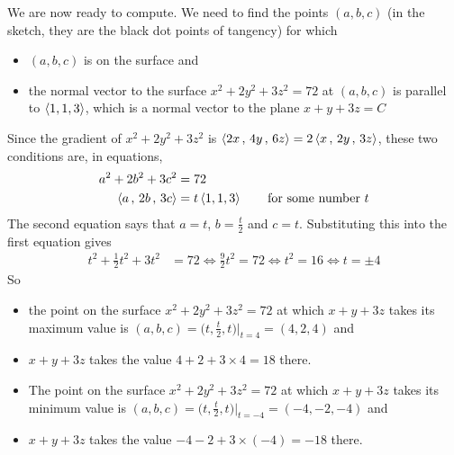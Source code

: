 \begin{eg}
We are now ready to compute. We need to find the points $(a,b,c)$
(in the sketch, they are the black dot points of tangency) for which
\begin{itemize}
\item $(a,b,c)$ is on the surface and
\item the normal vector to the surface $x^2+ 2y^2 +3z^2 = 72$
         at $(a,b,c)$ is parallel to $\left< 1,1,3\right>$, which is 
         a normal vector to the plane $x+y+3z=C$
\end{itemize}
Since the gradient of $x^2+ 2y^2 +3z^2$ is 
$\left< 2x\,,\,4y\,,\,6z\right>=2\left< x\,,\,2y\,,\,3z\right>$,
these two conditions are, in equations,
\begin{align*}
a^2+ 2b^2 +3c^2 &= 72 \\
\left< a\,,\,2b\,,\,3c\right> &=t \left< 1,1,3\right>\qquad
\text{for some number $t$}
\end{align*}
The second equation says that $a=t$, $b=\frac{t}{2}$ and $c=t$.
Substituting this into the first equation gives
\begin{align*}
t^2+ \frac{1}{2}t^2 +3t^2 &= 72
\iff \frac{9}{2}t^2=72
\iff t^2 = 16
\iff t=\pm 4
\end{align*}
So 
\begin{itemize}
\item 
the point on the surface  $x^2+ 2y^2 +3z^2 = 72$ at which 
$x+y+3z$ takes its maximum value is $(a,b,c) = \big(t,\frac{t}{2},t\big)\Big|_{t=4}=(4,2,4)$ and
\item
$x+y+3z$ takes the value $4+2+3\times 4 =18$ there.
\item
The point on the surface  $x^2+ 2y^2 +3z^2 = 72$ at which 
$x+y+3z$ takes its minimum value is $(a,b,c) 
=\big(t,\frac{t}{2},t\big)\Big|_{t=-4}= (-4,-2,-4)$ and
\item
$x+y+3z$ takes the value $-4-2+3\times (-4) =-18$ there. 
\end{itemize} 
\end{eg}

